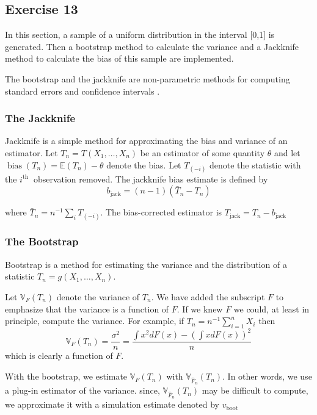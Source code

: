 \documentclass[11pt]{article}
\theoremstyle{definition}
\theoremstyle{remark}
\theoremstyle{remark}
\begin{document}
 \subsection*{Exercise 13}
 In this section, a sample of a uniform distribution in the interval
 [0,1] is generated. Then a bootstrap method to calculate the variance
 and a Jackknife method to calculate the bias of this sample are
 implemented.

The bootstrap and the jackknife are non-parametric methods for
computing standard errors and confidence intervals
\cite{rodgers1999bootstrap}.

\subsubsection*{The Jackknife}

Jackknife is a simple method for approximating the bias and variance
of an estimator. Let $T_{n}=T\left(X_{1}, \ldots, X_{n}\right)$ be an
estimator of some quantity $\theta$ and let
$\operatorname{bias}\left(T_{n}\right)=\mathbb{E}\left(T_{n}\right)-\theta$
denote the bias. Let $T_{(-i)}$ denote the statistic with the
$i^{\text {th }}$ observation removed. The jackknife bias estimate is
defined by
\[
  b_{\mathrm{jack}}=(n-1)\left(\bar{T}_{n}-T_{n}\right)
\]

where $\bar{T}_{n}=n^{-1} \sum_{i} T_{(-i)}$. The bias-corrected
estimator is $T_{\mathrm{jack}}=T_{n}-b_{\mathrm{jack}}$

\subsubsection*{The Bootstrap}

Bootstrap is a method for estimating the variance and the distribution
of a statistic $T_{n}=g\left(X_{1}, \ldots, X_{n}\right) .$

Let $\mathbb{V}_{F}\left(T_{n}\right)$ denote the variance of
$T_{n} .$ We have added the subscript $F$ to emphasize that the
variance is a function of $F$. If we knew $F$ we could, at least in
principle, compute the variance. For example, if
$T_{n}=n^{-1} \sum_{i=1}^{n} X_{i}$ then
\[
  \mathbb{V}_{F}\left(T_{n}\right)=\frac{\sigma^{2}}{n}=\frac{\int
    x^{2} d F(x)-\left(\int x d F(x)\right)^{2}}{n}
\]
which is clearly a function of $F$.

With the bootstrap, we estimate $\mathbb{V}_{F}\left(T_{n}\right)$
with $\mathbb{V}_{\widehat{F}_{n}}\left(T_{n}\right)$. In other words,
we use a plug-in estimator of the variance. since,
$\mathbb{V}_{\widehat{F}_{n}}\left(T_{n}\right)$ may be difficult to
compute, we approximate it with a simulation estimate denoted by
$v_{\text {boot }}$
\\
\end{document}
